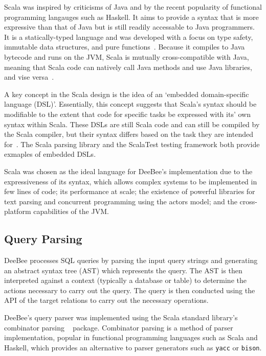 Scala was inspired by criticisms of Java and by the recent popularity of functional programming langauges such as Haskell. It aims to provide a syntax that is more expressive than that of Java but is still readily accessable to Java programmers. It is a statically-typed language and was developed with a focus on type safety, immutable data structures, and pure functions~\cite{odersky2004scala,odersky2004overview,odersky2008programming}. Because it compiles to Java bytecode and runs on the JVM, Scala is mutually cross-compatible with Java, meaning that Scala code can natively call Java methods and use Java libraries, and vise versa~\cite{odersky2008programming}.

A key concept in the Scala design is the idea of an `embedded domain-specific language (DSL)'. Essentially, this concept suggests that Scala's syntax should be modifiable to the extent that code for specific tasks be expressed with its' own syntax within Scala. These DSLs are still Scala code and can still be compiled by the Scala compiler, but their syntax differs based on the task they are intended for~\cite{ghosh2010dsls,hofer2008polymorphic,odersky2008programming}. The Scala parsing library and the ScalaTest testing framework both provide exmaples of embedded DSLs.

Scala was chosen as the ideal language for DeeBee's implementation due to the expressiveness of its syntax, which allows complex systems to be implemented in few lines of code; its performance at scale; the existence of powerful libraries for text parsing and concurrent programming using the actors model; and the cross-platform capabilities of the JVM.

\subsection{Query Parsing}
DeeBee processes SQL queries by parsing the input query strings and generating an abstract syntax tree (AST) which represents the query. The AST is then interpreted against a context (typically a database or table) to determine the actions necessary to carry out the query. The query is then conducted using the API of the target relations to carry out the necessary operations.

DeeBee's query parser was implemented using the Scala standard library's combinator parsing ~\cite{moors2008parser} package. Combinator parsing is a method of parser implementation, popular in functional programming languages such as Scala and Haskell, which provides an alternative to parser generators such as \texttt{yacc} or \texttt{bison}.

